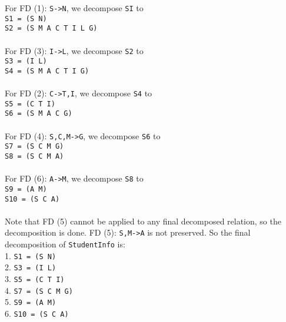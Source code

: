 \documentclass{article}
\begin{document}
For FD (1): \texttt{S->N}, we decompose \texttt{SI} to\\
\texttt{S1 = (S N)} \\
\texttt{S2 = (S M A C T I L G)} \\
\\
For FD (3): \texttt{I->L}, we decompose \texttt{S2} to\\
\texttt{S3 = (I L)} \\
\texttt{S4 = (S M A C T I G)} \\
\\
For FD (2): \texttt{C->T,I}, we decompose \texttt{S4} to \\
\texttt{S5 = (C T I)} \\
\texttt{S6 = (S M A C G)} \\
\\
For FD (4): \texttt{S,C,M->G}, we decompose \texttt{S6} to \\
\texttt{S7 = (S C M G)} \\
\texttt{S8 = (S C M A)} \\
\\
For FD (6): \texttt{A->M}, we decompose \texttt{S8} to \\
\texttt{S9 = (A M)} \\
\texttt{S10 = (S C A)}\\
\\
Note that FD (5) cannot be applied to any final decomposed relation, so the decomposition is done. FD (5): \texttt{S,M->A} is not preserved. So the final decomposition of \texttt{StudentInfo} is:\\
1. \texttt{S1 = (S N)} \\
2. \texttt{S3 = (I L)} \\
3. \texttt{S5 = (C T I)} \\
4. \texttt{S7 = (S C M G)} \\
5. \texttt{S9 = (A M)} \\
6. \texttt{S10 = (S C A)}\\
\end{document}
